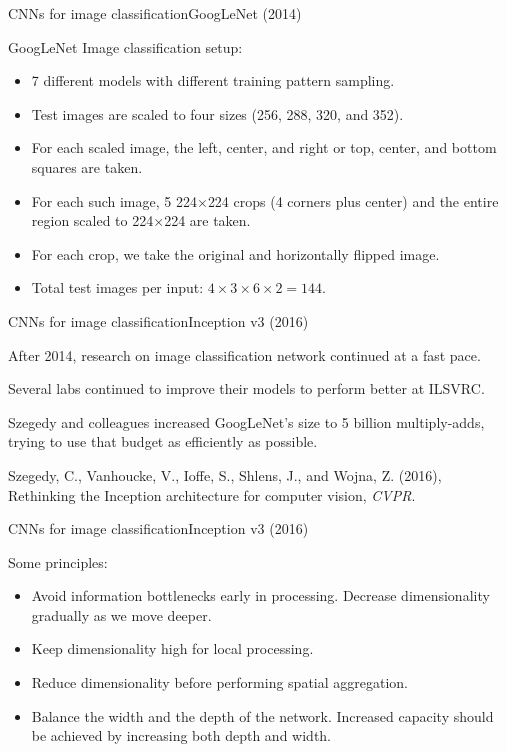 \documentclass{beamer}
\begin{document}
\begin{frame}{CNNs for image classification}{GoogLeNet (2014)}

  GoogLeNet Image classification setup:
  \begin{itemize}
  \item 7 different models with different training pattern sampling. 
  \item Test images are scaled to four sizes (256, 288, 320, and 352).
  \item For each scaled image, the left, center, and right or top,
    center, and bottom squares are taken.
  \item For each such image, 5 224$\times$224 crops (4 corners plus center)
    and the entire region scaled to 224$\times$224 are taken.
  \item For each crop, we take the original and horizontally flipped image.
  \item Total test images per input: $4\times 3\times 6\times 2 = 144$.
  \end{itemize}
  
\end{frame}


\begin{frame}{CNNs for image classification}{Inception v3 (2016)}

  After 2014, research on image classification network continued
  at a fast pace.

  \medskip

  Several labs continued to improve their models to perform better
  at ILSVRC.

  \medskip

  Szegedy and colleagues increased GoogLeNet's size to 5 billion
  multiply-adds, trying to use that budget as efficiently as possible.

  \medskip

  Szegedy, C., Vanhoucke, V., Ioffe, S., Shlens, J., and Wojna, Z. (2016),
  Rethinking the Inception architecture for computer vision, \textit{CVPR}.

\end{frame}


\begin{frame}{CNNs for image classification}{Inception v3 (2016)}

  Some principles:
  \begin{itemize}
    \item Avoid information bottlenecks early in processing. Decrease
      dimensionality gradually as we move deeper.
    \item Keep dimensionality high for local processing.
    \item Reduce dimensionality before performing spatial aggregation.
    \item Balance the width and the depth of the network. Increased
      capacity should be achieved by increasing both depth and width.
  \end{itemize}

\end{frame}
\end{document}
